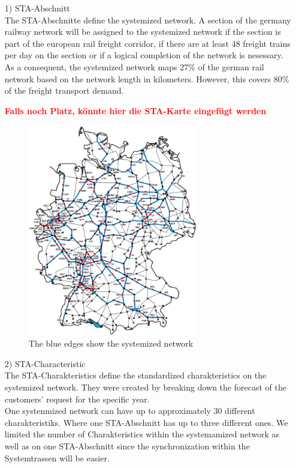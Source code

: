 \begin{itemize}
	\item[1)] STA-Abschnitt \\
	The STA-Abschnitte define the systemized network. A section of the germany railway network will be assigned to the systemized network if the section is part of the european rail freight corridor, if there are at least 48 freight trains per day on the section or if a logical completion of the network is nesessary. \\
	As a consequent, the systemized network maps 27\% of the german rail network based on the network length in kilometers. However, this covers 80\% of the freight transport demand. 
	
	\textbf{\textcolor{red}{Falls noch Platz, könnte hier die STA-Karte eingefügt werden}}
	\begin{figure}[h]
	\centering
	\includegraphics[width=0.7\textwidth]{Bilder/STA-Karte.jpg}
	\caption{The blue edges show the systemized network}
	\end{figure}
	
	\item[2)] STA-Characteristic \\
	The STA-Charakteristics define the standardized charakteristics on the systemized network. They were created by breaking down the forecast of the customers' request for the specific year. \\
	One systenmized network can have up to approximately 30 different charakteristiks. Where one STA-Abschnitt has up to three different ones. We limited the number of Charakteristics within the systemamized network as well as on one STA-Abschnitt since the synchronization within the Systemtrassen will be easier. 
	

\end{itemize}
